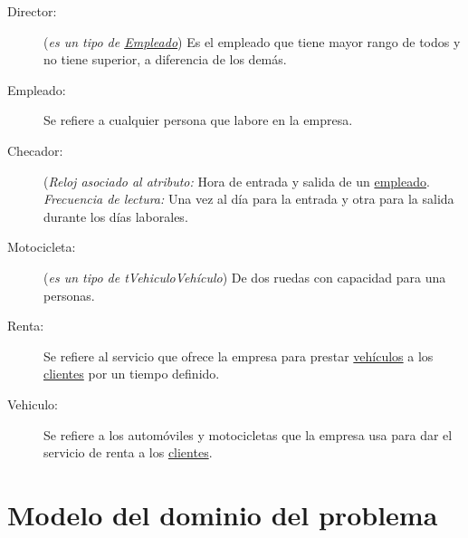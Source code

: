 \begin{description}
	
	\item[\hypertarget{tDirector}{Director:}] ({\em es un tipo de \hyperlink{tEmpleado}{Empleado}}) Es el empleado que tiene mayor rango de todos y no tiene superior, a diferencia de los demás.	
	\item[\hypertarget{tEmpleado}{Empleado:}] Se refiere a cualquier persona que labore en la empresa.
	 
	\item[\hypertarget{tChecador}{Checador:}] ({\em Reloj asociado al atributo:} Hora de entrada y salida de un \hyperlink{tEmpleado}{empleado}. {\em Frecuencia de lectura:} Una vez al día para la entrada y otra para la salida durante los días laborales.
	
	\item[\hypertarget{tMotocicleta}{Motocicleta:}] ({\em es un tipo de {tVehiculo}{Vehículo}}) De dos ruedas con capacidad para una personas. 

	\item[\hypertarget{tRenta}{Renta:}] Se refiere al servicio que ofrece la empresa para prestar \hyperlink{tVehiculo}{vehículos} a los \hyperlink{tCliente}{clientes} por un tiempo definido.
	
	\item[\hypertarget{tVehiculo}{Vehiculo:}] Se refiere a los automóviles y motocicletas que la empresa usa para dar el servicio de renta a los \hyperlink{tCliente}{clientes}.
	
\end{description}

\section{Modelo del dominio del problema}
\label{sec:hechosDeNegocio}


